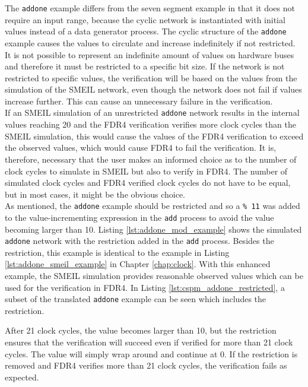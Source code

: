 The \texttt{addone} example differs from the seven segment example in that it does not require an input range, because the cyclic network is instantiated with initial values instead of a data generator process. The cyclic structure of the \texttt{addone} example causes the values to circulate and increase indefinitely if not restricted. It is not possible to represent an indefinite amount of values on hardware buses and therefore it must be restricted to a specific bit size. If the network is not restricted to specific values, the verification will be based on the values from the simulation of the SMEIL network, even though the network does not fail if values increase further.  This can cause an unnecessary failure in the verification. \\

If an SMEIL simulation of an unrestricted \texttt{addone} network results in the internal values reaching 20 and the FDR4 verification verifies more clock cycles than the SMEIL simulation, this would cause the values of the FDR4 verification to exceed the observed values, which would cause FDR4 to fail the verification. It is, therefore, necessary that the user makes an informed choice as to the number of clock cycles to simulate in SMEIL but also to verify in FDR4. The number of simulated clock cycles and FDR4 verified clock cycles do not have to be equal, but in most cases, it might be the obvious choice. \\

As mentioned, the \texttt{addone} example should be restricted and so a \texttt{\% 11} was added to the value-incrementing expression in the \texttt{add} process to avoid the value becoming larger than 10. Listing \ref{lst:addone_mod_example} shows the simulated \texttt{addone} network with the restriction added in the \texttt{add} process. Besides the restriction, this example is identical to the example in Listing \ref{lst:addone_smeil_example} in Chapter \ref{chap:clock}.
With this enhanced example, the SMEIL simulation provides reasonable observed values which can be used for the verification in FDR4. In Listing \ref{lst:cspm_addone_restricted}, a subset of the translated \texttt{addone} example can be seen which includes the restriction.

After 21 clock cycles, the value becomes larger than 10, but the restriction ensures that the verification will succeed even if verified for more than 21 clock cycles. The value will simply wrap around and continue at 0. If the restriction is removed and FDR4 verifies more than 21 clock cycles, the verification fails as expected. \\

